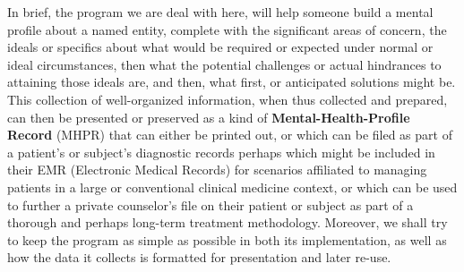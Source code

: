 \documentclass[a4paper, 18pt]{book} %
\begin{document}
\vspace{2em}


In brief, the program we are deal with here, will help someone build a mental profile about a named entity, complete with the significant areas of concern, the ideals or specifics about what would be required or expected under normal or ideal circumstances, then what the potential challenges or actual hindrances to attaining those ideals are, and then, what first, or anticipated solutions might be. This collection of well-organized information, when thus collected and prepared, can then be presented or preserved as a kind of \textbf{Mental-Health-Profile Record} (MHPR) that can either be printed out, or which can be filed as part of a patient's or subject's diagnostic records perhaps which might be included in their EMR (Electronic Medical Records) for scenarios affiliated to managing patients in a large or conventional clinical medicine context, or which can be used to further a private counselor's file on their patient or subject as part of a thorough and perhaps long-term treatment methodology. Moreover, we shall try to keep the program as simple as possible in both its implementation, as well as how the data it collects is formatted for presentation and later re-use.

\vspace{2em}
\end{document}
